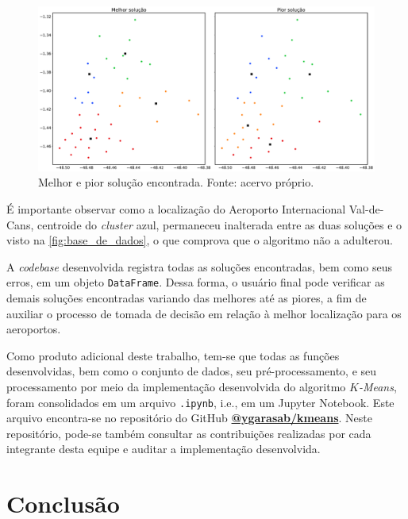 \documentclass[12pt]{article}
\begin{document}
\begin{figure}[t!]
    \includegraphics[width=\linewidth]{figures/resultados}
    \caption{Melhor e pior solução encontrada. Fonte: acervo próprio.}
    \label{fig:resultados}
\end{figure}

É importante observar como a localização do Aeroporto Internacional Val-de-Cans, centroide do \textit{cluster} azul, permaneceu inalterada entre as duas soluções e o visto na \autoref{fig:base_de_dados}, o que comprova que o algoritmo não a adulterou.

A \textit{codebase} desenvolvida registra todas as soluções encontradas, bem como seus erros, em um objeto \texttt{DataFrame}. Dessa forma, o usuário final pode verificar as demais soluções encontradas variando das melhores até as piores, a fim de auxiliar o processo de tomada de decisão em relação à melhor localização para os aeroportos.

Como produto adicional deste trabalho, tem-se que todas as funções desenvolvidas, bem como o conjunto de dados, seu pré-processamento, e seu processamento por meio da implementação desenvolvida do algoritmo \textit{$K$-Means}, foram consolidados em um arquivo \texttt{.ipynb}, i.e., em um Jupyter Notebook. Este arquivo encontra-se no repositório do GitHub \textbf{\href{https://github.com/ygarasab/kmeans}{@ygarasab/kmeans}}. Neste repositório, pode-se também consultar as contribuições realizadas por cada integrante desta equipe e auditar a implementação desenvolvida.


\section{Conclusão}   %
\label{sec:conclusao} %
\end{document}

